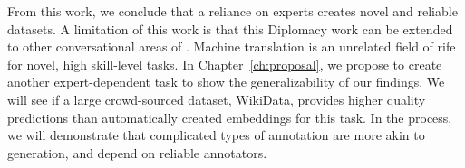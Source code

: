 From this work, we conclude that a reliance on experts creates novel and reliable datasets.  
%
A limitation of this work is that this Diplomacy work can be extended to other conversational areas of \nlp{}.  
%
Machine translation is an unrelated field of \nlp{} rife for novel, high skill-level tasks.  
%
In Chapter~\ref{ch:proposal}, we propose to create another expert-dependent task to show the generalizability of our findings.  
%
We will see if a large crowd-sourced dataset, WikiData, provides higher quality predictions than automatically created embeddings for this task. 
%
In the process, we will demonstrate that complicated types of annotation are more akin to generation, and depend on reliable annotators.  